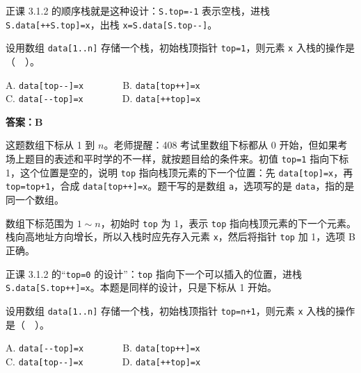 \documentclass[10.5pt,a4paper,oneside]{article}
\newcommand{\hlred}[1]{\textcolor{wdred}{\bfseries #1}}
\begin{document}
\begin{recallbox}

正课 3.1.2 的顺序栈就是这种设计：\texttt{S.top=-1} 表示空栈，进栈
\texttt{S.data{[}++S.top{]}=x}，出栈 \texttt{x=S.data{[}S.top-\/-{]}}。

\end{recallbox}

\begin{questionbox}[05]

设用数组 \texttt{data{[}1..n{]}} 存储一个栈，初始栈顶指针
\texttt{top=1}，则元素 \texttt{x} 入栈的操作是（　）。

A. \texttt{data{[}top-\/-{]}=x}　　　　B. \texttt{data{[}top++{]}=x}\\
C. \texttt{data{[}-\/-top{]}=x}　　　　D. \texttt{data{[}++top{]}=x}

\end{questionbox}

\hlred{\textbf{答案：B}}

\begin{videobox}

这题数组下标从 1 到 \(n\)。老师提醒：408 考试里数组下标都从 0
开始，但如果考场上题目的表述和平时学的不一样，就按题目给的条件来。初值
\texttt{top=1} 指向下标 1，这个位置是空的，说明 \texttt{top}
指向栈顶元素的下一个位置：先 \texttt{data{[}top{]}=x}，再
\texttt{top=top+1}，合成 \texttt{data{[}top++{]}=x}。题干写的是数组
\texttt{a}，选项写的是 \texttt{data}，指的是同一个数组。

\end{videobox}

\begin{jiexibox}

数组下标范围为 \(1\sim n\)，初始时 \texttt{top} 为 1，表示 \texttt{top}
指向栈顶元素的下一个元素。栈向高地址方向增长，所以入栈时应先存入元素
\texttt{x}，然后将指针 \texttt{top} 加 1，选项 B 正确。

\end{jiexibox}

\begin{recallbox}

正课 3.1.2 的“\texttt{top=0} 的设计”：\texttt{top}
指向下一个可以插入的位置，进栈
\texttt{S.data{[}S.top++{]}=x}。本题是同样的设计，只是下标从 1 开始。

\end{recallbox}

\begin{questionbox}[06]

设用数组 \texttt{data{[}1..n{]}} 存储一个栈，初始栈顶指针
\texttt{top=n+1}，则元素 \texttt{x} 入栈的操作是（　）。

A. \texttt{data{[}-\/-top{]}=x}　　　　B. \texttt{data{[}top++{]}=x}\\
C. \texttt{data{[}top-\/-{]}=x}　　　　D. \texttt{data{[}++top{]}=x}

\end{questionbox}
\end{document}
